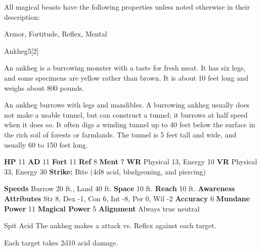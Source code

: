         All magical beasts have the following properties unless noted otherwise in their description:
        
    
     Armor,
     Fortitude,
     Reflex,
     Mental
  
  
      
  \begin{monsection}{Ankheg}{5}[2]
    \vspace{-1em}\vspace{-1em}
    \vspace{0em}

    
      An ankheg is a burrowing monster with a taste for fresh meat. It has six legs, and some specimens are yellow rather than brown. It is about 10 feet long and weighs about 800 pounds.

      An ankheg burrows with legs and mandibles. A burrowing ankheg usually does not make a usable tunnel, but can construct a tunnel; it burrows at half speed when it does so. It often digs a winding tunnel up to 40 feet below the surface in the rich soil of forests or farmlands. The tunnel is 5 feet tall and wide, and usually 60 to 150 feet long.
    
    

    \begin{spellcontent}
      \begin{spelltargetinginfo}
        \pari \textbf{HP} 11 \monsep
          \textbf{AD} 11 \monsep
          \textbf{Fort} 11 \monsep
          \textbf{Ref} 8 \monsep
          \textbf{Ment} 7
        \pari \textbf{WR} Physical 13, Energy 10 \monsep
        \textbf{VR} Physical 33, Energy 30
        \pari \textbf{Strike:}
            Bite  (4d8 acid, bludgeoning, and piercing)
      \end{spelltargetinginfo}
    \end{spellcontent}
    \begin{monsterfooter}
      \pari \textbf{Speeds} Burrow 20 ft., Land 40 ft. \monsep
        \textbf{Space} 10 ft. \monsep
        \textbf{Reach} 10 ft.
      \pari \textbf{Awareness} 
      \pari \textbf{Attributes}
        Str 8, Dex -1,
        Con 6, Int -8,
        Per 0, Wil -2
      \pari \textbf{Accuracy} 6 \monsep
        \textbf{Mundane Power} 11 \monsep
      \textbf{Magical Power} 5
      \pari \textbf{Alignment} Always true neutral
    \end{monsterfooter}
  \end{monsection}
  \begin{freeability}{Spit Acid}
       The ankheg makes a  attack
        vs. Reflex against each target.
    
    \hit Each target takes 2d10 acid damage.
    \end{freeability}
  

